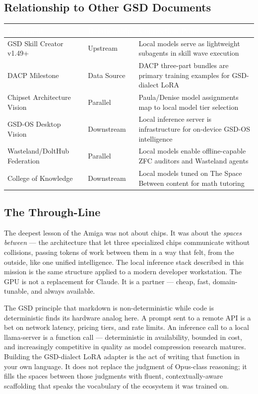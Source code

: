 \documentclass[11pt,letterpaper]{article}
\newcommand{\tableheader}[1]{\textbf{\sffamily\textcolor{white}{#1}}}
\begin{document}
\subsection{Relationship to Other GSD Documents}

\begin{center}
\begin{tabularx}{\textwidth}{L{4cm}L{2.5cm}X}
\toprule
{}
\tableheader{Document} & \tableheader{Relationship} & \tableheader{Connection Point} \\
\midrule
GSD Skill Creator v1.49+ & Upstream & Local models serve as lightweight subagents in skill wave execution \\
DACP Milestone & Data Source & DACP three-part bundles are primary training examples for GSD-dialect LoRA \\
Chipset Architecture Vision & Parallel & Paula/Denise model assignments map to local model tier selection \\
GSD-OS Desktop Vision & Downstream & Local inference server is infrastructure for on-device GSD-OS intelligence \\
Wasteland/DoltHub Federation & Parallel & Local models enable offline-capable ZFC auditors and Wasteland agents \\
College of Knowledge & Downstream & Local models tuned on The Space Between content for math tutoring \\
\bottomrule
\end{tabularx}
\end{center}

\subsection{The Through-Line}

The deepest lesson of the Amiga was not about chips. It was about the \emph{spaces between} --- the architecture that let three specialized chips communicate without collisions, passing tokens of work between them in a way that felt, from the outside, like one unified intelligence. The local inference stack described in this mission is the same structure applied to a modern developer workstation. The GPU is not a replacement for Claude. It is a partner --- cheap, fast, domain-tunable, and always available.

The GSD principle that markdown is non-deterministic while code is deterministic finds its hardware analog here. A prompt sent to a remote API is a bet on network latency, pricing tiers, and rate limits. An inference call to a local llama-server is a function call --- deterministic in availability, bounded in cost, and increasingly competitive in quality as model compression research matures. Building the GSD-dialect LoRA adapter is the act of writing that function in your own language. It does not replace the judgment of Opus-class reasoning; it fills the spaces between those judgments with fluent, contextually-aware scaffolding that speaks the vocabulary of the ecosystem it was trained on.
\end{document}
